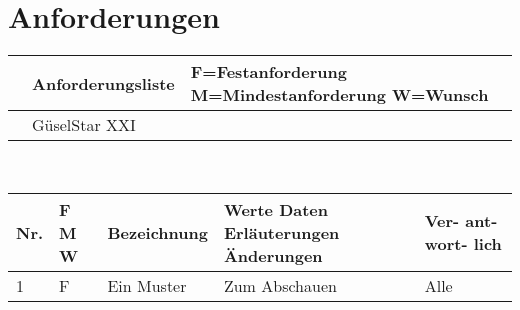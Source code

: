 \section{Anforderungen}
\begin{center}
\begin{tabular}{|p{4cm}|p{6cm}|p{4cm}|}\hline
     &   \huge{Anforderungsliste} & F=Festanforderung M=Mindestanforderung W=Wunsch \\\hline
     &   GüselStar XXI            &  \\\hline
\end{tabular}\\[0.5cm]
\begin{tabular}{|p{1cm}|p{0.5cm}|p{5cm}|p{5cm}|p{1.5cm}|}\hline
\textbf{Nr.} & \textbf{F M W} & \textbf{Bezeichnung} & \textbf{Werte Daten Erläuterungen Änderungen} & \textbf{Ver- ant- wort- lich}\\\hline
1 & F & Ein Muster & Zum Abschauen & Alle\\\hline
\end{tabular}
\end{center}
